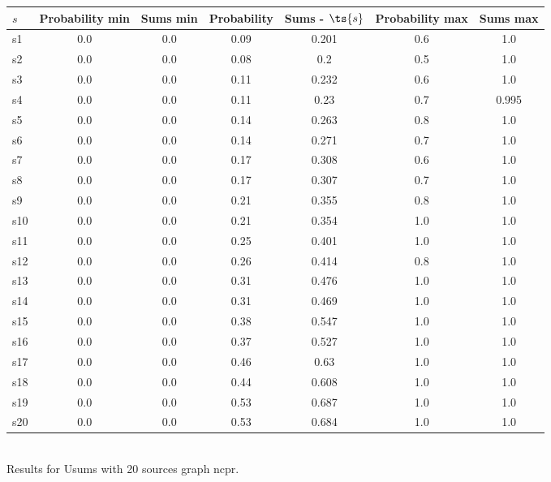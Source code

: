 \documentclass{article}
\begin{document}
\noindent\begin{tabular}{|l|c|c|c|c|c|c|}
\hline
$s$& Probability min & Sums min & Probability & Sums - $\ts{s}$ & Probability max & Sums max\\
\hline
s1 &0.0 & 0.0 & 0.09 & 0.201 & 0.6 & 1.0\\
\hline
s2 &0.0 & 0.0 & 0.08 & 0.2 & 0.5 & 1.0\\
\hline
s3 &0.0 & 0.0 & 0.11 & 0.232 & 0.6 & 1.0\\
\hline
s4 &0.0 & 0.0 & 0.11 & 0.23 & 0.7 & 0.995\\
\hline
s5 &0.0 & 0.0 & 0.14 & 0.263 & 0.8 & 1.0\\
\hline
s6 &0.0 & 0.0 & 0.14 & 0.271 & 0.7 & 1.0\\
\hline
s7 &0.0 & 0.0 & 0.17 & 0.308 & 0.6 & 1.0\\
\hline
s8 &0.0 & 0.0 & 0.17 & 0.307 & 0.7 & 1.0\\
\hline
s9 &0.0 & 0.0 & 0.21 & 0.355 & 0.8 & 1.0\\
\hline
s10 &0.0 & 0.0 & 0.21 & 0.354 & 1.0 & 1.0\\
\hline
s11 &0.0 & 0.0 & 0.25 & 0.401 & 1.0 & 1.0\\
\hline
s12 &0.0 & 0.0 & 0.26 & 0.414 & 0.8 & 1.0\\
\hline
s13 &0.0 & 0.0 & 0.31 & 0.476 & 1.0 & 1.0\\
\hline
s14 &0.0 & 0.0 & 0.31 & 0.469 & 1.0 & 1.0\\
\hline
s15 &0.0 & 0.0 & 0.38 & 0.547 & 1.0 & 1.0\\
\hline
s16 &0.0 & 0.0 & 0.37 & 0.527 & 1.0 & 1.0\\
\hline
s17 &0.0 & 0.0 & 0.46 & 0.63 & 1.0 & 1.0\\
\hline
s18 &0.0 & 0.0 & 0.44 & 0.608 & 1.0 & 1.0\\
\hline
s19 &0.0 & 0.0 & 0.53 & 0.687 & 1.0 & 1.0\\
\hline
s20 &0.0 & 0.0 & 0.53 & 0.684 & 1.0 & 1.0\\
\hline
\end{tabular}\\

\noindent Results for Usums with 20 sources graph ncpr.
\end{document}
